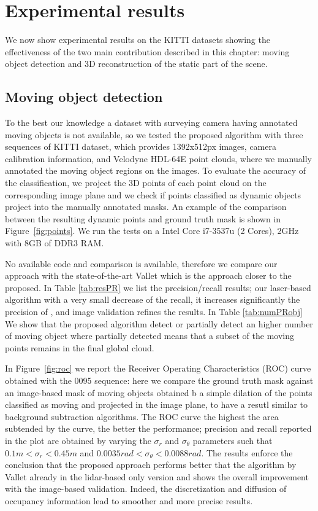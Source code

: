 \section{Experimental results}%
\label{sec:experiments}
We now show experimental results on the KITTI datasets showing the effectiveness of the two main contribution described in this chapter: moving object detection and 3D reconstruction of the static part of the scene.
\subsection{Moving object detection}
To the best our knowledge a dataset with surveying camera having annotated moving objects is not available, so we tested the proposed algorithm with three sequences of KITTI \cite{Kitti} dataset, which provides 1392x512px images, camera calibration information, and Velodyne HDL-64E point clouds, where we manually annotated the moving object regions on the images. To evaluate the accuracy of the classification, we project the 3D points of each point cloud on the corresponding image plane and we check if points classified as dynamic objects project into the manually annotated masks. An example of the comparison between the resulting dynamic points and ground truth mask is shown in Figure~\ref{fig:points}.
We run the tests on a  Intel Core i7-3537u (2 Cores), 2GHz with 8GB of DDR3 RAM. 

No available code and comparison is available, therefore we compare our approach with the state-of-the-art Vallet \etal \cite{vallet2015extracting} which is the approach closer to the proposed.
In Table \ref{tab:resPR} we list the precision/recall results; our laser-based algorithm with a very small decrease of the recall, it increases significantly the precision of \cite{vallet2015extracting}, and image validation refines the results.
In Table \ref{tab:numPRobj} We show that the proposed algorithm detect or partially detect an higher number of moving object where  partially detected means that a subset of the moving points remains in the final global cloud.

In Figure~\ref{fig:roc} we report the Receiver Operating Characteristics (ROC) curve obtained with the 0095 sequence: here we compare the ground truth mask against an image-based mask of moving objects obtained b a simple dilation of the points classified as moving and projected in the image plane, to have a resutl similar to background subtraction algorithms. 
The ROC curve the highest the area subtended by the curve, the better the performance; precision and recall reported in the plot are obtained by varying the $\sigma_r$ and $\sigma_{\theta}$ parameters such that $0.1m<\sigma_r<0.45m$ and $0.0035rad<\sigma_{\theta}<0.0088rad$.
The results enforce the conclusion that the proposed approach performs better that the algorithm by Vallet \etal already in the lidar-based only version and shows the overall improvement with the image-based validation. Indeed, the discretization and diffusion of occupancy information lead to smoother and more precise results.

